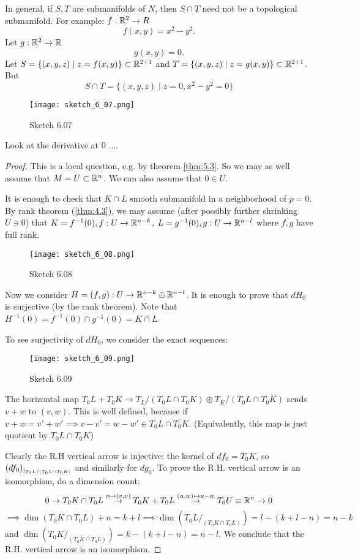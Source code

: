 \begin{remark}
    In general, if \(S,T\) are submanifolds of \(N\), then \(S\cap T\) need not be a topological submanifold.
    For example: \(f:\mathbb{R}^2\to R\)
    \[f(x,y)=x^2-y^2.\]
    Let \(g:\mathbb{R}^2\to \mathbb{R}\) 
    \[g(x,y)=0.\]
    Let \(S=\{(x,y,z)\mid z=f(x,y)\}\subset \mathbb{R}^{2+1}\) and \(T=\{(x,y,z)\mid z=g(x,y)\}\subset \mathbb{R}^{2+1}\).
    But \[S\cap T=\{(x,y,z)\mid z=0,x^2-y^2=0\}\]
    \begin{figure}[H]
        \centering
        \texttt{[image: sketch\_6\_07.png]}
        \caption{Sketch 6.07}
    \end{figure} 
    Look at the derivative at 0 .... %
\end{remark}

\begin{proof}
    This is a local question, e.g. by theorem \ref{thm:5.3}. So we may as well assume that \(M=U\subset \mathbb{R}^n\).
    We can also assume that \(0\in U\).
    
    It is enough to check that \(K\cap L\) smooth submanifold in a neighborhood of \(p=0\). By rank theorem (\ref{thm:4.3}), we may assume 
    (after possibly further shrinking \(U\ni 0\)) that \(K=f^{-1}(0),f:U\to\mathbb{R}^{n-k}\),
    \(L=g^{-1}(0), g:U\to\mathbb{R}^{n-l}\) where \(f,g\) have full rank.

    \begin{figure}[H]
        \centering
        \texttt{[image: sketch\_6\_08.png]}
        \caption{Sketch 6.08}
    \end{figure}
    Now we consider \(H=(f,g):U\to \mathbb{R}^{n-k}\oplus \mathbb{R}^{n-l}\). It is enough to prove that \(dH_0\) is 
    surjective (by the rank theorem). Note that \(H^{-1}(0)=f^{-1}(0)\cap g^{-1}(0)=K\cap L\).

    To see surjectivity of \(dH_0\), we consider the exact sequences: 
    \begin{figure}[H]
        \centering
        \texttt{[image: sketch\_6\_09.png]}
        \caption{Sketch 6.09}
    \end{figure}
    The horizontal map \(T_0 L + T_0 K\to T_L/(T_0L\cap T_0K)\oplus T_K/(T_0L\cap T_0K)\) sends \(v+w\)
    to \((v,w)\). This is well defined, because if \(v+w=v'+w'\implies v-v'=w-w'\in T_0L\cap T_0K\). (Equivalently, this map is 
    just quotient by \(T_0L\cap T_0K\)) %

    Clearly the R.H vertical arrow is injective: the kernel of \(df_0=T_0K\), so \((df_0)_{|_{T_0L/(T_0L\cap T_0K)}}\) and similarly for \(dg_0\).
    To prove the R.H. vertical arrow is an isomorphism, do a dimension count: 
    \[0\to T_0K\cap T_0L\stackrel{v\mapsto (v,v)}{\to} T_0K + T_0L\stackrel{(u,w)\mapsto u-w}{\to} T_0U\equiv \mathbb{R}^n\to 0\]
    \(\implies \dim(T_0K\cap T_0L)+n=k+l\implies \dim(T_0L/_{(T_0K\cap T_0L)})=l-(k+l-n)=n-k\) and \(\dim(T_0K/_{(T_0K\cap T_0L)})=k-(k+l-n)=n-l\).
    We conclude that the R.H. vertical arrow is an isomorphism. 
\end{proof}

